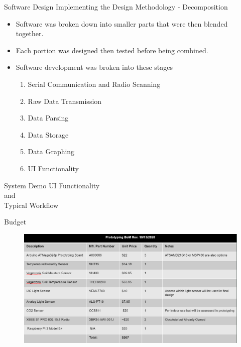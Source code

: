 \documentclass{beamer}
\begin{document}
\begin{frame}{Software Design}
    Implementing the Design Methodology - Decomposition \\
    \begin{itemize}
        \item
              Software was broken down into smaller parts that were then blended together.
        \item
              Each portion was designed then tested before being combined.
        \item
              Software development was broken into these stages
              \begin{enumerate}
                  \item
                        Serial Communication and Radio Scanning
                  \item
                        Raw Data Transmission
                  \item
                        Data Parsing
                  \item
                        Data Storage
                  \item
                        Data Graphing
                  \item
                        UI Functionality
              \end{enumerate}
    \end{itemize}
\end{frame}

\begin{frame}{System Demo}
    UI Functionality \\ and\\
    Typical Workflow
\end{frame}


\begin{frame}{Budget}
    \begin{figure}
        \centering
        \includegraphics[width=\linewidth]{PNGs/PartsList.PNG}
        \label{fig:bom}
    \end{figure}
\end{frame}
\end{document}
